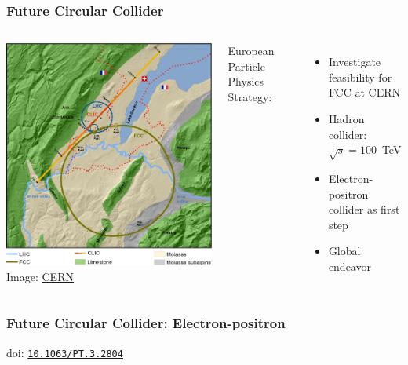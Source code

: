 \documentclass{beamer}
\begin{document}
\begin{frame}
  \frametitle{Future Circular Collider}

  \begin{columns}[c]
    \includegraphics[width=\linewidth]{figures/FCC_CLIC.png}
    \vspace{-10mm}
    {\tiny Image: \href{https://alumni.cern/news/226282}{CERN}}

    European Particle Physics Strategy:
    \begin{itemize}
      \item Investigate feasibility for FCC at CERN
      \item Hadron collider: $\sqrt{s} = 100$~TeV
      \item Electron-positron collider as first step
      \item Global endeavor
    \end{itemize}
  \end{columns}

\end{frame}


\begin{frame}
  \frametitle{Future Circular Collider: Electron-positron}


  \tiny{doi: \texttt{\href{https://doi.org/10.1063/PT.3.2804}
                          {10.1063/PT.3.2804}}}
\end{frame}
\end{document}
